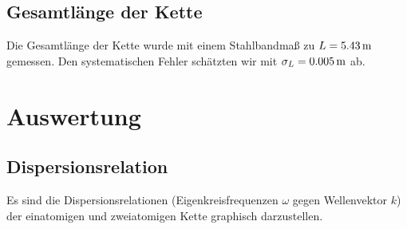 \documentclass[a4paper,titlepage]{scrartcl}
\numberwithin{equation}{section}
\begin{document}
\subsection{Gesamtlänge der Kette}
\label{subsec:gesamtlaenge}
Die Gesamtlänge der Kette wurde mit einem Stahlbandmaß zu $L=\unit[5.43]{m}$ gemessen. Den systematischen Fehler schätzten wir mit $\sigma_L=\unit[0.005]{m}$ ab.
\section{Auswertung}
\subsection{Dispersionsrelation}
Es sind die Dispersionsrelationen (Eigenkreisfrequenzen $\omega$ gegen Wellenvektor $k$) der einatomigen und zweiatomigen Kette graphisch darzustellen.
\end{document}
